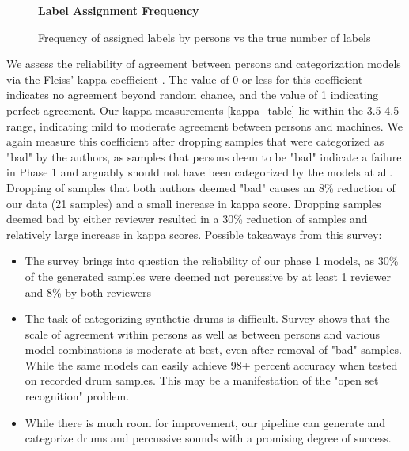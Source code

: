 \documentclass[\main/thesis.tex]{subfiles}
\begin{document}
\begin{figure}[h!]
    \begin{center}
    \textbf{Label Assignment Frequency}
    \end{center}
    \caption{Frequency of assigned labels by persons vs the true number of labels}
\label{fig:freq-survey-2p}
\end{figure}
We assess the reliability of agreement between persons and categorization models via the Fleiss' kappa coefficient \cite{fleiss1971measuring}. The value of 0 or less for this coefficient indicates no agreement beyond random chance, and the value of 1 indicating perfect agreement. Our kappa measurements \ref{kappa_table} lie within the 3.5-4.5 range, indicating mild to moderate agreement between persons and machines. We again measure this coefficient after dropping samples that were categorized as "bad" by the authors, as samples that persons deem to be "bad" indicate a failure in Phase 1 and arguably should not have been categorized by the models at all. Dropping of samples that both authors deemed "bad" causes an 8\% reduction of our data (21 samples) and a small increase in kappa score. Dropping samples deemed bad by either reviewer resulted in a 30\% reduction of samples and relatively large increase in kappa scores. 
Possible takeaways from this survey:


\begin{itemize}
    \item The survey brings into question the reliability of our phase 1 models, as 30\% of the generated samples were deemed not percussive by at least 1 reviewer and 8\% by both reviewers
    \item The task of categorizing synthetic drums is difficult. Survey shows that the scale of agreement within persons as well as between persons and various model combinations is moderate at best, even after removal of "bad" samples.  While the same models can easily achieve 98+ percent accuracy when tested on recorded drum samples. This may be a manifestation of the "open set recognition" problem. 
    \item While there is much room for improvement, our pipeline can generate and categorize drums and percussive sounds with a promising degree of success. 
\end{itemize}
\end{document}
